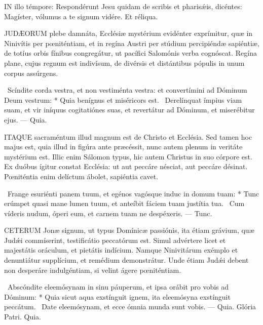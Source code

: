 \sectionornament




\lettrine[lines=2]{I}{N} illo témpore: Respondérunt Jesu quidam de scribis et pharisǽis, dicéntes: Magíster, vólumus a te signum vidére. Et réliqua.



\lettrine[lines=2]{J}{UDÆORUM} plebe damnáta, Ecclésiæ mystérium evidénter exprímitur, quæ in Ninivítis per pœniténtiam, et in regína Austri per stúdium percipiéndæ sapiéntiæ, de totíus orbis fínibus congregátur, ut pacífici Salomónis verba cognóscat. Regína plane, cujus regnum est indivísum, de divérsis et distántibus pópulis in unum corpus assúrgens.

\R\ Scíndite corda vestra, et non vestiménta vestra: et convertímini ad Dóminum Deum vestrum: * Quia benígnus et miséricors est. \V\ Derelínquat ímpius viam suam, et vir iníquus cogitatiónes suas, et revertátur ad Dóminum, et miserébitur ejus. --- Quia.


\lettrine[lines=2]{I}{TAQUE} sacraméntum illud magnum est de Christo et Ecclésia. Sed tamen hoc majus est, quia illud in figúra ante præcéssit, nunc autem plenum in veritáte mystérium est. Illic enim Sálomon typus, hic autem Christus in suo córpore est. Ex duóbus ígitur constat Ecclésia: ut aut peccáre nésciat, aut peccáre désinat. Pœniténtia enim delíctum ábolet, sapiéntia cavet.

\R\ Frange esuriénti panem tuum, et egénos vagósque induc in domum tuam: * Tunc erúmpet quasi mane lumen tuum, et anteíbit fáciem tuam justítia tua. \V\ Cum víderis nudum, óperi eum, et carnem tuam ne despéxeris. --- Tunc.


\lettrine[lines=2]{C}{ETERUM} Jonæ signum, ut typus Domínicæ passiónis, ita étiam grávium, quæ Judǽi commíserint, testificátio peccatórum est. Simul advértere licet et majestátis oráculum, et pietátis indícium. Namque Ninivitárum exémplo et denuntiátur supplícium, et remédium demonstrátur. Unde étiam Judǽi debent non desperáre indulgéntiam, si velint ágere pœniténtiam.

\R\ Abscóndite eleemósynam in sinu páuperum, et ipsa orábit pro vobis ad Dóminum: * Quia sicut aqua exstínguit ignem, ita eleemósyna exstínguit peccátum. \V\ Date eleemósynam, et ecce ómnia munda sunt vobis. --- Quia. Glória Patri. Quia.

